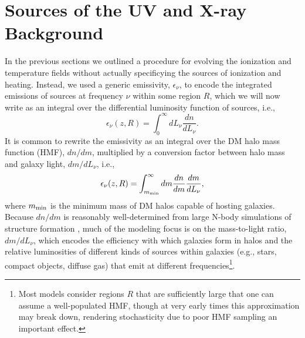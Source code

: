 \section{Sources of the UV and X-ray Background} \label{sec:sources}
In the previous sections we outlined a procedure for evolving the ionization and temperature fields without actually specificying the sources of ionization and heating. Instead, we used a generic emissivity, $\epsilon_{\nu}$, to encode the integrated emissions of sources at frequency $\nu$ within some region $R$, which we will now write as an integral over the differential luminosity function of sources, i.e.,
\begin{equation}
	\epsilon_{\nu}(z,R) = \int_0^{\infty} dL_{\nu} \frac{dn}{dL_{\nu}} .
\end{equation}
It is common to rewrite the emissivity as an integral over the DM halo mass function (HMF), $dn/dm$, multiplied by a conversion factor between halo mass and galaxy light, $dm/dL_{\nu}$, i.e.,
\begin{equation}
	\epsilon_{\nu}(z,R) = \int_{m_{\text{min}}}^{\infty} dm \frac{dn}{dm} \frac{dm}{d L_{\nu}} ,
\end{equation}
where $m_{\text{min}}$ is the minimum mass of DM halos capable of hosting galaxies. Because $dn/dm$ is reasonably well-determined from large N-body simulations of structure formation \cite{PS1974,SMT2001,Tinker2010}, much of the modeling focus is on the mass-to-light ratio, $dm/dL_{\nu}$, which encodes the efficiency with which galaxies form in halos and the relative luminosities of different kinds of sources within galaxies (e.g., stars, compact objects, diffuse gas) that emit at different frequencies\footnote{Most models consider regions $R$ that are sufficiently large that one can assume a well-populated HMF, though at very early times this approximation may break down, rendering stochasticity due to poor HMF sampling an important effect.}. 

